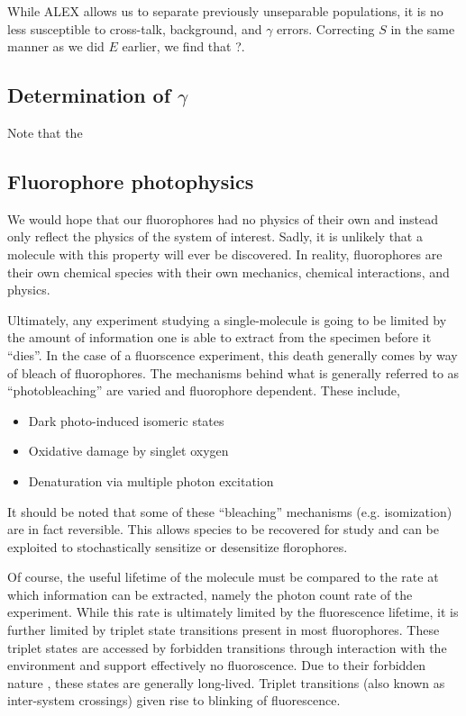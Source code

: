 \documentclass{article}
\begin{document}
While ALEX allows us to separate previously unseparable populations,
it is no less susceptible to cross-talk, background, and $\gamma$
errors. Correcting $S$ in the same manner as we did $E$ earlier, we
find that ?.


\subsection{Determination of $\gamma$}

Note that the

\subsection{Fluorophore photophysics}
We would hope that our fluorophores had no physics of their own and
instead only reflect the physics of the system of interest. Sadly,
it is unlikely that a molecule with this property will ever be
discovered. In reality, fluorophores are their own chemical species
with their own mechanics, chemical interactions, and physics. 

Ultimately, any experiment studying a single-molecule is going to be
limited by the amount of information one is able to extract from the
specimen before it ``dies''. In the case of a fluorscence experiment,
this death generally comes by way of bleach of fluorophores. The
mechanisms behind what is generally referred to as ``photobleaching''
are varied and fluorophore dependent. These include,
\begin{itemize}
\item Dark photo-induced isomeric states
\item Oxidative damage by singlet oxygen
\item Denaturation via multiple photon excitation\cite{Deschenes2002}
\end{itemize}
It should be noted that some of these ``bleaching'' mechanisms
(e.g. isomization) are in fact reversible. This allows species to be
recovered for study and can be exploited to stochastically sensitize
or desensitize florophores.

Of course, the useful lifetime of the molecule must be compared to the
rate at which information can be extracted, namely the photon count
rate of the experiment. While this rate is ultimately limited by the
fluorescence lifetime, it is further limited by triplet state transitions
present in most fluorophores. These triplet states are accessed by
forbidden transitions through
interaction with the environment and support effectively no
fluoroscence. Due to their forbidden nature , these states are
generally long-lived. Triplet transitions (also known as inter-system
crossings) given rise to blinking of fluorescence.
\end{document}
